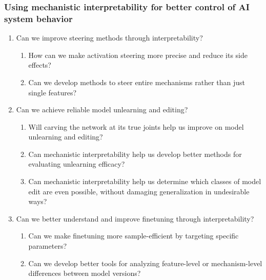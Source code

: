 \subsubsection{Using mechanistic interpretability for better control of AI system behavior}
\begin{enumerate}
    \item Can we improve steering methods through interpretability?
    \begin{enumerate}[label=\alph*.]
        \item How can we make activation steering more precise and reduce its side effects?
        \item Can we develop methods to steer entire mechanisms rather than just single features?
    \end{enumerate}
    
    \item Can we achieve reliable model unlearning and editing?
    \begin{enumerate}[label=\alph*.]
        \item Will carving the network at its true joints help us improve on model unlearning and editing?
        \item Can mechanistic interpretability help us develop better methods for evaluating unlearning efficacy?
        \item Can mechanistic interpretability help us determine which classes of model edit are even possible, without damaging generalization in undesirable ways?
    \end{enumerate}
    
    \item Can we better understand and improve finetuning through interpretability?
    \begin{enumerate}[label=\alph*.]
        \item Can we make finetuning more sample-efficient by targeting specific parameters?
        \item Can we develop better tools for analyzing feature-level or mechanism-level differences between model versions?
    \end{enumerate}
\end{enumerate}

